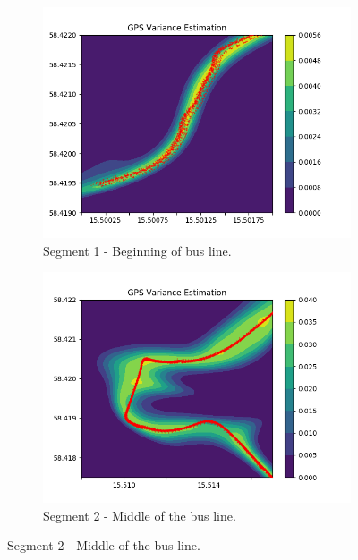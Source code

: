 \begin{figure}
    \centering
    \begin{subfigure}[b]{0.475\textwidth}
        \centering
        \includegraphics[width=\textwidth]{figures/gps_var/f1_ard_contour_segment1_combine}
        \caption[]%
        {{\small Segment 1 - Beginning of bus line.}}    
        \label{fig:contour-segment-1}
    \end{subfigure}
    \hfill
    \begin{subfigure}[b]{0.475\textwidth}  
        \centering 
        \includegraphics[width=\textwidth]{figures/gps_var/f1_ard_contour_segment2_combine}
        \caption[]%
        {{\small Segment 2 - Middle of the bus line.}}    
        \label{fig:contour-segment-2}

\end{subfigure}
\end{figure}
